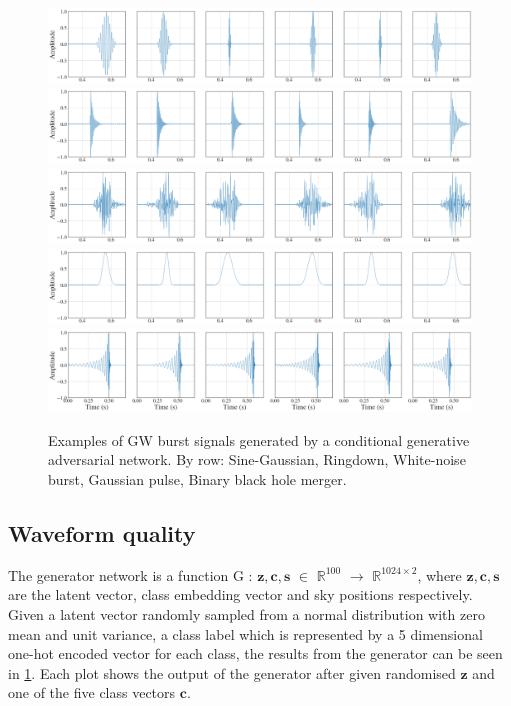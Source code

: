 \documentclass[12pt]{iopart}
\begin{document}
\begin{figure}
    \centering
    \includegraphics[width=\textwidth]{figures/generations/sg.png}
    \includegraphics[width=\textwidth]{figures/generations/rd.png}
    \includegraphics[width=\textwidth]{figures/generations/wnb.png}
    \includegraphics[width=\textwidth]{figures/generations/blip.png}
    \includegraphics[width=\textwidth]{figures/generations/bbh.png}
    \caption{Examples of \ac{GW} burst signals generated by a conditional generative adversarial network. By row: Sine-Gaussian, Ringdown,
White-noise burst, Gaussian pulse, Binary black hole merger.}
\label{fig:gen_signals} \end{figure}

\subsection{Waveform quality}
The generator network is a function G : $\mathbf{z},\mathbf{c},\mathbb{\textbf{s}}$ $\in$ $\mathbb{R}^{100}$ $\to$ $\mathbb{R}^{1024\times2}$, where $\mathbf{z},\mathbf{c},\mathbb{\textbf{s}}$ are the latent vector, class embedding vector and sky positions respectively. Given a latent vector randomly sampled from a normal distribution with zero mean and unit variance, a class label which is represented by a 5 dimensional one-hot encoded vector for each class, the results from the generator can be seen in \cref{fig:gen_signals}. Each plot shows the output of the generator after given randomised $\mathbf{z}$ and one of the five class vectors $\mathbf{c}$.
\end{document}

